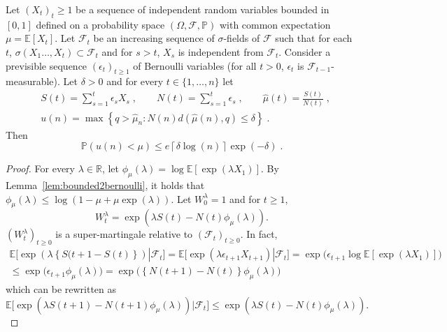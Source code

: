 \documentclass[wcp]{jmlr}
\newcommand{\E}{\mathbb{E}}
\renewcommand{\P}{\mathbb{P}}
\newcommand{\R}{\mathbb{R}}
\newcommand{\1}{\mathbbm{1}}
\def\F{\mathcal{F}}
\begin{document}
{%
\begin{theorem}\label{th:borneDev}
  Let $(X_t)_t\geq 1$ be a sequence of independent random variables bounded in
  $[0,1]$ defined on a probability space $(\Omega, \F, \P)$ with common
  expectation $\mu=\E[X_t]$.  Let $\F_t$ be an increasing sequence of
  $\sigma$-fields of $\F$ such that for each $t$, $\sigma(X_1\ldots,
  X_t)\subset \F_t$ and for $s>t$, $X_s$ is independent from $\F_t$.  Consider
  a previsible sequence $(\epsilon_t)_{t\geq 1}$ of Bernoulli variables (for
  all $t > 0$, $\epsilon_t$ is $\F_{t-1}$-measurable). Let $\delta>0$ and for
  every $t\in\{1,\dots,n\}$ let
  \begin{align*}
    &S(t) =\sum_{s=1}^t \epsilon_s X_s \; , \qquad N(t) = \sum_{s=1}^t
    \epsilon_s\;, \qquad
    \hat{\mu}(t) = \frac{S(t)}{N(t)}\;, \\
    &u(n) = \max \left\{q>\hat{\mu}_n : N(n)d\left( \hat{\mu}(n), q \right)
      \leq \delta\right\}\;.
  \end{align*}
  Then
  \[\P\left( u(n)< \mu\right) \leq e\left\lceil \delta\log(n) \right\rceil
  \exp(-\delta)\;.\]
\end{theorem}
\begin{proof}
  For every $\lambda\in\R$, let
  $\phi_\mu(\lambda) = \log \E\left[ \exp\left( \lambda X_1 \right)
  \right]$. By Lemma~\ref{lem:bounded2bernoulli}, it holds that $\phi_\mu(\lambda)\leq \log \left( 1-\mu+\mu \exp\left( \lambda \right) \right)$.  Let
  $W^{\lambda}_0=1$ and for $t\geq 1$, $$W^{\lambda}_t = \exp(\lambda S(t) -
  N(t) \phi_\mu(\lambda)).$$ $\left(W^{\lambda}_t\right)_{t\geq 0}$ is a
  super-martingale relative to $\left( \F_t \right)_{t\geq 0}$. In fact,
  \begin{multline*}
    \E\big[ \exp\left( \lambda\left\{ S(t+1-S(t) \right\} \right) | \F_t\big] =\E\big[ \exp\left( \lambda \epsilon_{t+1} X_{t+1}\right) | \F_t\big]
     =  \exp\big(  \epsilon_{t+1} \log \E\left[ \exp\left( \lambda X_1 \right) \right] \big)\\
     \leq \exp\big(   \epsilon_{t+1} \phi_\mu\left( \lambda \right) \big)
    = \exp \big( \left\{ N(t+1)-N(t) \right\} \phi_\mu\left( \lambda \right)
    \big)
  \end{multline*}
  which can be rewritten as
  \[
  \E\big[\exp\left( \lambda S(t+1)-N(t+1)\phi_\mu\left( \lambda \right)
    \right) | \F_{t}\big]  \leq \exp\left( \lambda S(t)-N(t)\phi_\mu\left(
      \lambda \right) \right).
  \]


\end{proof}}
\end{document}
